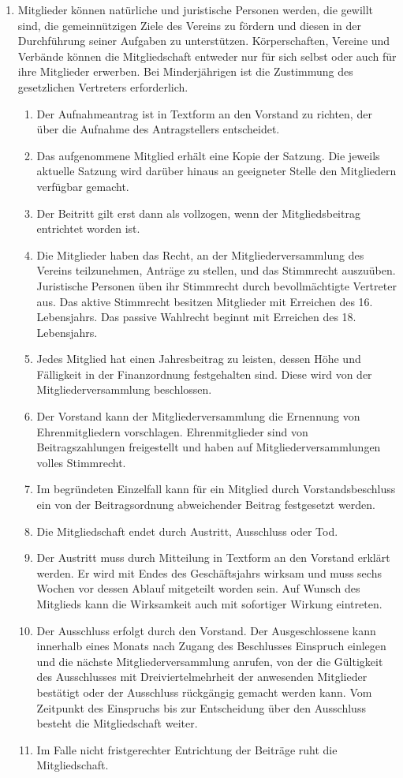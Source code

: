 \documentclass[12pt,a4paper]{article}
\begin{document}
\begin{enumerate}
\item Mitglieder können natürliche und juristische Personen werden, die gewillt sind, die gemeinnützigen Ziele des Vereins zu fördern und diesen in der Durchführung seiner Aufgaben zu unterstützen. Körperschaften, Vereine und Verbände können die Mitgliedschaft entweder nur für sich selbst oder auch für ihre Mitglieder erwerben. Bei Minderjährigen ist die Zustimmung des gesetzlichen Vertreters erforderlich.
\begin{enumerate}
\item Der Aufnahmeantrag ist in Textform an den Vorstand zu richten, der über die Aufnahme des Antragstellers entscheidet.
\item Das aufgenommene Mitglied erhält eine Kopie der Satzung. Die jeweils aktuelle Satzung wird darüber hinaus an geeigneter Stelle den Mitgliedern verfügbar gemacht.
\item Der Beitritt gilt erst dann als vollzogen, wenn der Mitgliedsbeitrag entrichtet worden ist.
\item Die Mitglieder haben das Recht, an der Mitgliederversammlung des Vereins teilzunehmen, Anträge zu stellen, und das Stimmrecht auszuüben. Juristische Personen üben ihr Stimmrecht durch bevollmächtigte Vertreter aus. Das aktive Stimmrecht besitzen Mitglieder mit Erreichen des 16. Lebensjahrs. Das passive Wahlrecht beginnt mit Erreichen des 18. Lebensjahrs.
\item Jedes Mitglied hat einen Jahresbeitrag zu leisten, dessen Höhe und Fälligkeit in der Finanzordnung festgehalten sind. Diese wird von der Mitgliederversammlung beschlossen.
\item Der Vorstand kann der Mitgliederversammlung die Ernennung von Ehrenmitgliedern vorschlagen. Ehrenmitglieder sind von Beitragszahlungen freigestellt und haben auf Mitgliederversammlungen volles Stimmrecht.
\item Im begründeten Einzelfall kann für ein Mitglied durch Vorstandsbeschluss ein von der Beitragsordnung abweichender Beitrag festgesetzt werden.
\item Die Mitgliedschaft endet durch Austritt, Ausschluss oder Tod.
\item Der Austritt muss durch Mitteilung in Textform an den Vorstand erklärt werden. Er wird mit Endes des Geschäftsjahrs wirksam und muss sechs Wochen vor dessen Ablauf mitgeteilt worden sein. Auf Wunsch des Mitglieds kann die Wirksamkeit auch mit sofortiger Wirkung eintreten.
\item Der Ausschluss erfolgt durch den Vorstand. Der Ausgeschlossene kann innerhalb eines Monats nach Zugang des Beschlusses Einspruch einlegen und die nächste Mitgliederversammlung anrufen, von der die Gültigkeit des Ausschlusses mit Dreiviertelmehrheit der anwesenden Mitglieder bestätigt oder der Ausschluss rückgängig gemacht werden kann. Vom Zeitpunkt des Einspruchs bis zur Entscheidung über den Ausschluss besteht die Mitgliedschaft weiter.
\item Im Falle nicht fristgerechter Entrichtung der Beiträge ruht die Mitgliedschaft.
\end{enumerate}
\end{enumerate}
\end{document}
